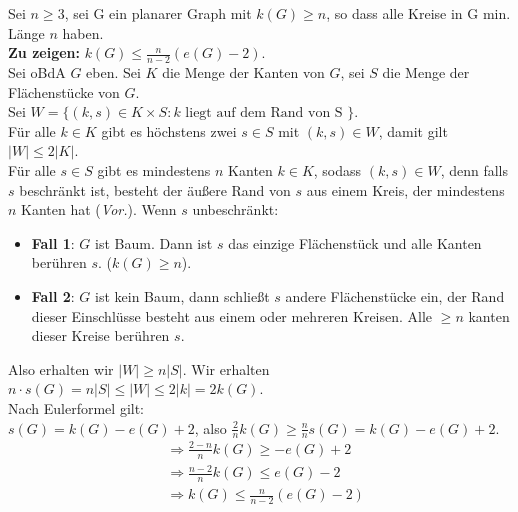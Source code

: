\begin{problem*}[1a]
  Sei \( n \geq 3 \), sei G ein planarer Graph mit \( k(G) \geq n \), so dass alle Kreise in G min. Länge \( n \) haben. \\
  \textbf{Zu zeigen:} \( k(G) \leq \frac{n}{n-2}(e(G) - 2) \). \\
  Sei oBdA \( G \) eben. Sei \( K \) die Menge der Kanten von \( G \), sei \( S \) die Menge der Flächenstücke von \( G \). \\
  Sei \( W = \{ (k,s) \in K \times S : k \text{ liegt auf dem Rand von S } \} \). \\
  Für alle \( k \in K \) gibt es höchstens zwei \( s \in S \) mit \( (k,s) \in W \), damit gilt \( \vert W \vert \leq 2 \vert K \vert \). \\
  Für alle \( s \in S \) gibt es mindestens \( n \) Kanten \( k \in K \), sodass \( (k,s) \in W \), denn falls \( s \) beschränkt ist, besteht der äußere Rand von \( s \) aus einem Kreis, der mindestens \( n \) Kanten hat (\emph{Vor.}). Wenn \( s \) unbeschränkt:
  \begin{itemize}
    \item \textbf{Fall 1}: \( G \) ist Baum. Dann ist \( s \) das einzige Flächenstück und alle Kanten berühren \( s \). (\( k(G) \geq n \)).
    \item \textbf{Fall 2}: \( G \) ist kein Baum, dann schließt \( s \) andere Flächenstücke ein, der Rand dieser Einschlüsse besteht aus einem oder mehreren Kreisen. Alle \( \geq n \) kanten dieser Kreise berühren \( s \).
  \end{itemize} 
  Also erhalten wir \( \vert W \vert \geq n \vert S \vert \). Wir erhalten \( n \cdot s(G) = n\vert S \vert \leq \vert W \vert \leq 2 \vert k \vert = 2k(G) \). \\
  Nach Eulerformel gilt: \\
  \( s(G) = k(G) - e(G) + 2 \), also \( \frac{2}{n}k(G) \geq \frac{n}{n} s(G) = k(G) - e(G) + 2 \).
  \begin{align*}
    &\Rightarrow \frac{2-n}{n}k(G) \geq - e(G) + 2 \\
    &\Rightarrow \frac{n-2}{n}k(G) \leq e(G) - 2 \\
    &\Rightarrow k(G) \leq \frac{n}{n-2}(e(G) - 2)
  \end{align*}
\end{problem*}

